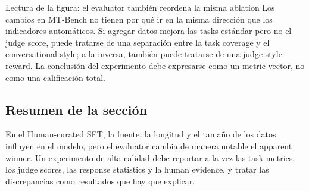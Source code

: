 
\begin{knowledgebox}{Lectura de la figura: el evaluator también reordena la misma ablation}
Los cambios en MT-Bench no tienen por qué ir en la misma dirección que los indicadores automáticos. Si agregar datos mejora las tasks estándar pero no el judge score, puede tratarse de una separación entre la task coverage y el conversational style; a la inversa, también puede tratarse de una judge style reward. La conclusión del experimento debe expresarse como un metric vector, no como una calificación total.
\end{knowledgebox}


\subsection{Resumen de la sección}

En el Human-curated SFT, la fuente, la longitud y el tamaño de los datos influyen en el modelo, pero el evaluator cambia de manera notable el apparent winner. Un experimento de alta calidad debe reportar a la vez las task metrics, los judge scores, las response statistics y la human evidence, y tratar las discrepancias como resultados que hay que explicar.
